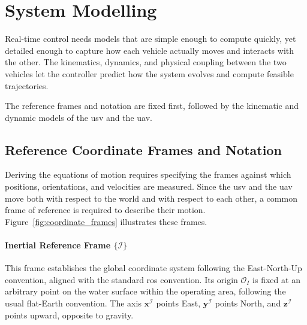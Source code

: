 
\section{System Modelling}
\label{sec:system_modeling}
\label{chapter:modeling}

Real-time control needs models that are simple enough to compute quickly, yet detailed enough to capture how each vehicle actually moves and interacts with the other. The kinematics, dynamics, and physical coupling between the two vehicles let the controller predict how the system evolves and compute feasible trajectories.

The reference frames and notation are fixed first, followed by the kinematic and dynamic models of the \gls{usv} and the \gls{uav}.


\subsection{Reference Coordinate Frames and Notation}
\label{sec:mod_coordinates}

Deriving the equations of motion requires specifying the frames against which positions, orientations, and velocities are measured. Since the \gls{usv} and the \gls{uav} move both with respect to the world and with respect to each other, a common frame of reference is required to describe their motion. Figure~\ref{fig:coordinate_frames} illustrates these frames.

\paragraph{Inertial Reference Frame $\{\mathcal{I}\}$}
This frame establishes the global coordinate system following the East-North-Up convention, aligned with the standard \gls{ros} convention. Its origin $\mathcal{O}_I$ is fixed at an arbitrary point on the water surface within the operating area, following the usual flat-Earth convention. The axis $\mathbf{x}^{\mathcal{I}}$ points East, $\mathbf{y}^{\mathcal{I}}$ points North, and $\mathbf{z}^{\mathcal{I}}$ points upward, opposite to gravity.

